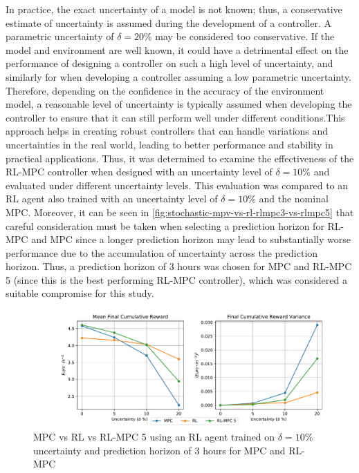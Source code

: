 In practice, the exact uncertainty of a model is not known; thus, a conservative estimate of uncertainty is assumed during the development of a controller. A parametric uncertainty of $\delta = 20\%$ may be considered too conservative. If the model and environment are well known, it could have a detrimental effect on the performance of designing a controller on such a high level of uncertainty, and similarly for when developing a controller assuming a low parametric uncertainty. Therefore, depending on the confidence in the accuracy of the environment model, a reasonable level of uncertainty is typically assumed when developing the controller to ensure that it can still perform well under different conditions.This approach helps in creating robust controllers that can handle variations and uncertainties in the real world, leading to better performance and stability in practical applications. Thus, it was determined to examine the effectiveness of the RL-MPC controller when designed with an uncertainty level of $\delta = 10\%$ and evaluated under different uncertainty levels. This evaluation was compared to an RL agent also trained with an uncertainty level of $\delta = 10\%$ and the nominal MPC. Moreover, it can be seen in \autoref{fig:stochastic-mpv-vs-rl-rlmpc3-vs-rlmpc5} that careful consideration must be taken when selecting a prediction horizon for RL-MPC and MPC since a longer prediction horizon may lead to substantially worse performance due to the accumulation of uncertainty across the prediction horizon. Thus, a prediction horizon of 3 hours was chosen for MPC and RL-MPC 5 (since this is the best performing RL-MPC controller), which was considered a suitable compromise for this study.

\begin{figure}[H]
	\centering
	\includegraphics[width=\textwidth]{figures/stochastic_realife.pdf}
	\caption{MPC vs RL vs RL-MPC 5 using an RL agent trained on $\delta = 10\%$ uncertainty and prediction horizon of 3 hours for MPC and RL-MPC}
	\label{fig:stochastic-reallife}
\end{figure}


